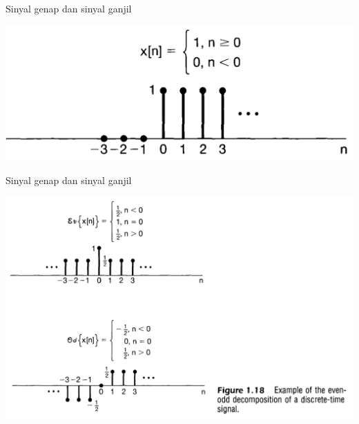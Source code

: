 \documentclass[pdflatex,compress,mathserif]{beamer}
\begin{document}
\begin{frame}{Sinyal genap dan sinyal ganjil}
	\begin{center}
		\includegraphics[width=0.8\linewidth]{img/img29}
	\end{center}
\end{frame}

\begin{frame}{Sinyal genap dan sinyal ganjil}
	\begin{center}
		\includegraphics[height=0.8\textheight]{img/img30}
	\end{center}
\end{frame}
\end{document}
